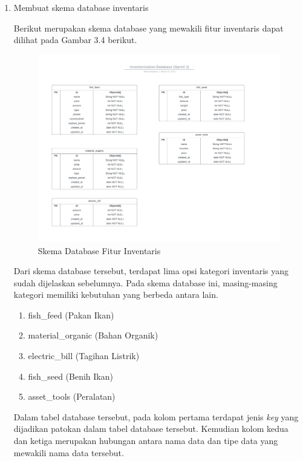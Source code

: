 \begin{enumerate}
	\item Membuat skema database inventaris
	
	Berikut merupakan skema database yang mewakili fitur inventaris dapat dilihat pada Gambar 3.4 berikut.

	\begin{figure}[H]
		\centering
		\includegraphics[width=1\textwidth]{gambar/akbar/sprint1/sprint1_inventaris_database.jpeg}
		\caption{Skema Database Fitur Inventaris}
	\end{figure}

	Dari skema database tersebut, terdapat lima opsi kategori inventaris yang sudah dijelaskan sebelumnya. Pada skema database ini, masing-masing kategori memiliki kebutuhan yang berbeda antara lain.

	\begin{enumerate}
		\item fish\_feed (Pakan Ikan)
		\item material\_organic (Bahan Organik)
		\item electric\_bill (Tagihan Listrik)
		\item fish\_seed (Benih Ikan)
		\item asset\_tools (Peralatan)
	\end{enumerate}

	Dalam tabel database tersebut, pada kolom pertama terdapat jenis \textit{key} yang dijadikan patokan dalam tabel database tersebut. Kemudian kolom kedua dan ketiga merupakan hubungan antara nama data dan tipe data yang mewakili nama data tersebut.


\end{enumerate}
